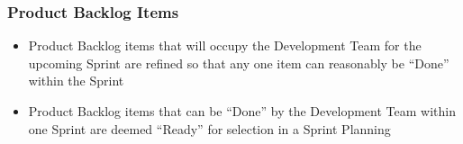 \begin{frame}
    \frametitle{Product Backlog Items}
    \begin{itemize}
        \setlength\itemsep{0.7em}
        \item Product Backlog items that will occupy the Development Team for the upcoming Sprint are refined so that any one item can reasonably be ``Done'' within the Sprint
        \item Product Backlog items that can be ``Done'' by the Development Team within one Sprint are deemed ``Ready'' for selection in a Sprint Planning
    \end{itemize}
    \vspace{1em}
\end{frame}